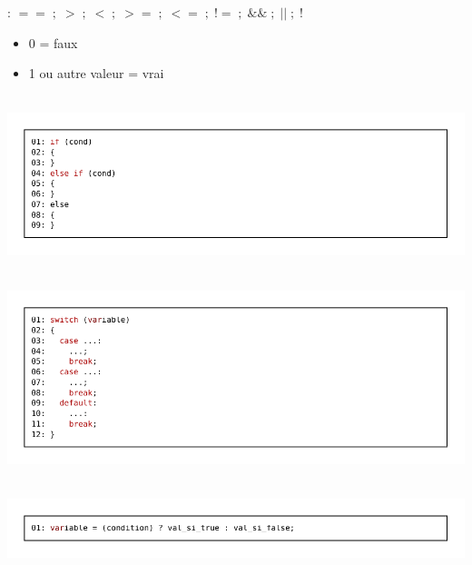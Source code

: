  : $== \; ; \; > \; ; \; < \; ; \; >= \; ; \; <= \; ; \; != \; ; \; \&\& \; ; \; || \; ; \; !$

\par

\begin{itemize}
	\item 0 = faux
	\item 1 ou autre valeur = vrai
\end{itemize}

\par

 \\
\includegraphics[width=\linewidth]{D6_1.pdf}

\par

 \\
\includegraphics[width=\linewidth]{D6_2.pdf}

\par

 \\
\includegraphics[width=\linewidth]{D6_3.pdf}

\vspace{-0.5cm}
